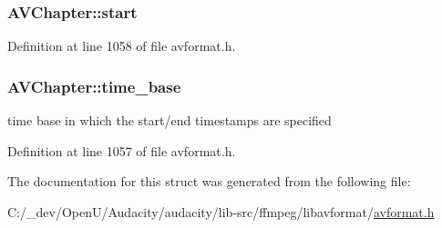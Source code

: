 \subsubsection[{\texorpdfstring{start}{start}}]{ A\+V\+Chapter\+::start}\hypertarget{struct_a_v_chapter_a499a5062224e22249be6f2d16f74c449}{}\label{struct_a_v_chapter_a499a5062224e22249be6f2d16f74c449}


Definition at line 1058 of file avformat.\+h.

\subsubsection[{\texorpdfstring{time\+\_\+base}{time_base}}]{ A\+V\+Chapter\+::time\+\_\+base}\hypertarget{struct_a_v_chapter_acb5cb6ce9bb6b9f4b970a919f4899818}{}\label{struct_a_v_chapter_acb5cb6ce9bb6b9f4b970a919f4899818}


time base in which the start/end timestamps are specified 



Definition at line 1057 of file avformat.\+h.



The documentation for this struct was generated from the following file\+:\begin{DoxyCompactItemize}
\item 
C\+:/\+\_\+dev/\+Open\+U/\+Audacity/audacity/lib-\/src/ffmpeg/libavformat/\hyperlink{avformat_8h}{avformat.\+h}\end{DoxyCompactItemize}

